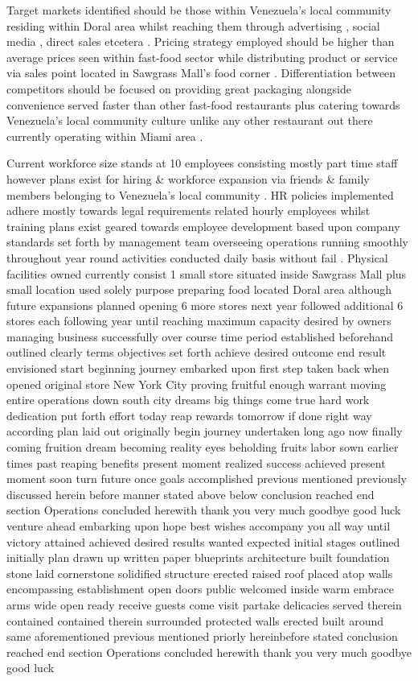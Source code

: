  Target markets identified should be those within Venezuela’s local community residing within Doral area whilst reaching them through advertising , social media , direct sales etcetera . Pricing strategy employed should be higher than average prices seen within fast-food sector while distributing product or service via sales point located in Sawgrass Mall's food corner . Differentiation between competitors should be focused on providing great packaging alongside convenience served faster than other fast-food restaurants plus catering towards Venezuela’s local community culture unlike any other restaurant out there currently operating within Miami area .  

 Current workforce size stands at 10 employees consisting mostly part time staff however plans exist for hiring & workforce expansion via friends & family members belonging to Venezuela’s local community . HR policies implemented adhere mostly towards legal requirements related hourly employees whilst training plans exist geared towards employee development based upon company standards set forth by management team overseeing operations running smoothly throughout year round activities conducted daily basis without fail . Physical facilities owned currently consist 1 small store situated inside Sawgrass Mall plus small location used solely purpose preparing food located Doral area although future expansions planned opening 6 more stores next year followed additional 6 stores each following year until reaching maximum capacity desired by owners managing business successfully over course time period established beforehand outlined clearly terms objectives set forth achieve desired outcome end result envisioned start beginning journey embarked upon first step taken back when opened original store New York City proving fruitful enough warrant moving entire operations down south city dreams big things come true hard work dedication put forth effort today reap rewards tomorrow if done right way according plan laid out originally begin journey undertaken long ago now finally coming fruition dream becoming reality eyes beholding fruits labor sown earlier times past reaping benefits present moment realized success achieved present moment soon turn future once goals accomplished previous mentioned previously discussed herein before manner stated above below conclusion reached end section Operations concluded herewith thank you very much goodbye good luck venture ahead embarking upon hope best wishes accompany you all way until victory attained achieved desired results wanted expected initial stages outlined initially plan drawn up written paper blueprints architecture built foundation stone laid cornerstone solidified structure erected raised roof placed atop walls encompassing establishment open doors public welcomed inside warm embrace arms wide open ready receive guests come visit partake delicacies served therein contained contained therein surrounded protected walls erected built around same aforementioned previous mentioned priorly hereinbefore stated conclusion reached end section Operations concluded herewith thank you very much goodbye good luck